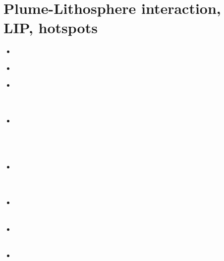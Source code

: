 \section{Plume-Lithosphere interaction, LIP, hotspots}

\begin{scriptsize}
\begin{itemize}
\item[\nineteenninety] 
\textcite{davi90} \\
\item[\nineteenninetyone] 
\textcite{grca91} \\
\item[\nineteenninetytwo] 
\textcite{hicd92} \\
\textcite{cagr92} \\
\textcite{sask92} \\
\item[\nineteenninetyfour] 
\textcite{rich94} \\ 
\textcite{fari94} \\
\textcite{ride94} \\ 
\textcite{davi94} \\
\item[\nineteenninetyfive] 
\textcite{whmc95} \\
\textcite{fari95} \\
\textcite{rict95} \\
\item[\nineteenninetysix] 
\textcite{zhgm96} \\
\textcite{ribe96} \\
\item[\nineteenninetyeight] 
\textcite{most98} \\
\textcite{ride98} \\
\item[\nineteenninetynine] 

\end{itemize}
\end{scriptsize}
